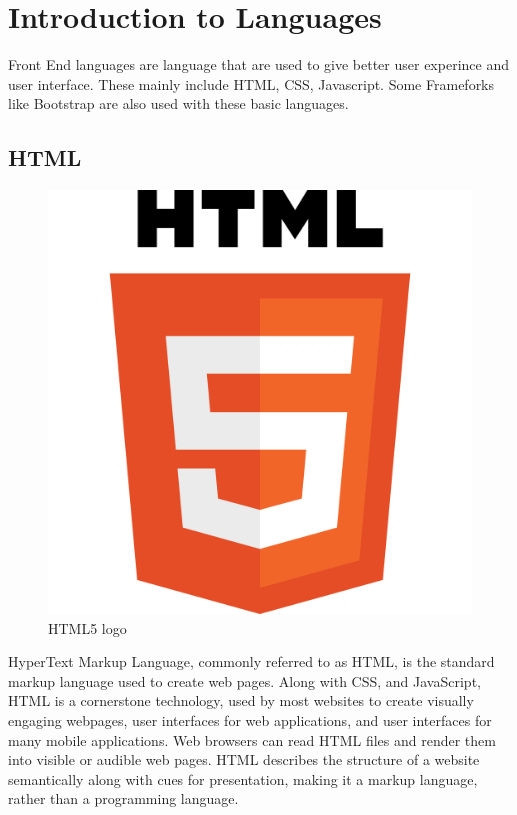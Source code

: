 \section[Introduction to Languages]{Introduction to Languages}
Front End languages are language that are used to give better user experince and user interface. These mainly include HTML, CSS, Javascript. Some Frameforks like Bootstrap are also used with these basic languages.
\subsection{HTML}

\begin{figure}[h]
\centering \includegraphics[scale=0.90]{input/images/HTML.png}
\caption{HTML5 logo}
\end{figure}
HyperText Markup Language, commonly referred to as HTML, is the standard markup language used to create web pages. Along with CSS, and JavaScript, HTML is a cornerstone technology, used by most websites to create visually engaging webpages, user interfaces for web applications, and user interfaces for many mobile applications. Web browsers can read HTML files and render them into visible or audible web pages. HTML describes the structure of a website semantically along with cues for presentation, making it a markup language, rather than a programming language.


